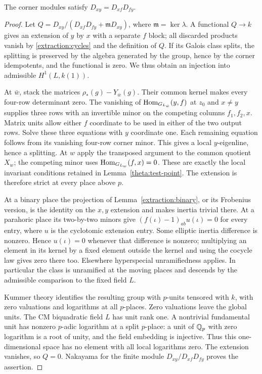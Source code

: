 \begin{lemma}
\label{extraction:cyclotomic}
The corner modules satisfy $D_{xy}=D_{xf}D_{fy}$.
\end{lemma}

\begin{proof}
Let $Q=D_{xy}/(D_{xf}D_{fy}+\mathfrak mD_{xy})$, where
$\mathfrak m=\ker\lambda$.  A functional $Q\to k$ gives
an extension of $y$ by $x$ with a separate $f$ block; all
discarded products vanish by \eqref{extraction:cycles} and
the definition of $Q$.  If its Galois class splits, the
splitting is preserved by the algebra generated by the
group, hence by the corner idempotents, and the functional
is zero.  We thus obtain an injection into admissible
$H^1(L,k(1))$.

At $\bar w$, stack the matrices
$\rho_*(g)-Y_{\bar w}(g)$.  Their common kernel makes every
four-row determinant zero.  The vanishing of
$\operatorname{Hom}_{G_{L_{\bar w}}}(y,f)$ at $z_0$ and $x\ne y$
supplies three rows with an invertible minor on the competing
columns $f_1,f_2,x$.  Matrix units allow either $f$ coordinate
to be used in either of the two output rows.  Solve these
three equations with $y$ coordinate one.  Each remaining
equation follows from its vanishing four-row corner minor.
This gives a local $y$-eigenline, hence a splitting.  At $w$
apply the transposed argument to the common quotient $X_w$;
the competing minor uses
$\operatorname{Hom}_{G_{L_w}}(f,x)=0$.  These are exactly the local
invariant conditions retained in Lemma~\ref{theta:test-point}.
The extension is therefore strict at every place above $p$.

At a binary place the projection of
Lemma~\ref{extraction:binary}, or its Frobenius version,
is the identity on the $x,y$ extension and makes inertia
trivial there.  At a parahoric place its two-by-two minors
give $(f(\iota)-1)_{ab}u(\iota)=0$ for every entry, where
$u$ is the cyclotomic extension entry.  Some elliptic
inertia difference is nonzero.  Hence $u(\iota)=0$ whenever
that difference is nonzero; multiplying an element in its
kernel by a fixed element outside the kernel and using the
cocycle law gives zero there too.  Elsewhere hyperspecial
unramifiedness applies.  In particular the class is
unramified at the moving places and descends by the
admissible comparison to the fixed field $L$.

Kummer theory identifies the resulting group with $p$-units
tensored with $k$, with zero valuations and logarithms at
all $p$-places.  Zero valuations leave the global units.
The CM biquadratic field $L$ has unit rank one.  A nontrivial
fundamental unit has nonzero $p$-adic logarithm at a split
$p$-place: a unit of $\mathbb Q_p$ with zero logarithm is a root
of unity, and the field embedding is injective.  Thus this
one-dimensional space has no element with all local
logarithms zero.  The extension vanishes, so $Q=0$.
Nakayama for the finite module $D_{xy}/D_{xf}D_{fy}$ proves
the assertion.
\end{proof}

